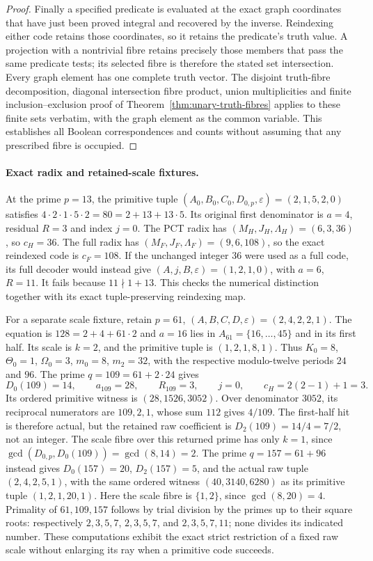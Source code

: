 \begin{proof}
Finally a specified predicate is evaluated at the exact graph
coordinates that have just been proved integral and recovered by
the inverse.  Reindexing either code retains those coordinates, so
it retains the predicate's truth value.  A projection with a
nontrivial fibre retains precisely those members that pass the same
predicate tests; its selected fibre is therefore the stated set
intersection.  Every graph element has one complete truth vector.
The disjoint truth-fibre decomposition, diagonal intersection
fibre product, union multiplicities and finite inclusion--exclusion
proof of Theorem~\ref{thm:unary-truth-fibres} applies to these
finite sets verbatim, with the graph element as the common variable.
This establishes all Boolean correspondences and counts without
assuming that any prescribed fibre is occupied.
\end{proof}

\paragraph{Exact radix and retained-scale fixtures.}
At the prime \(p=13\), the primitive tuple
\((A_0,B_0,C_0,D_{0,p},\varepsilon)=(2,1,5,2,0)\)
satisfies \(4\cdot2\cdot1\cdot5\cdot2=80=2+13+13\cdot5\).
Its original first denominator is \(a=4\), residual \(R=3\)
and index \(j=0\).  The PCT radix has
\((M_H,J_H,\Lambda_H)=(6,3,36)\), so \(c_H=36\).
The full radix has \((M_F,J_F,\Lambda_F)=(9,6,108)\),
so the exact reindexed code is \(c_F=108\).
If the unchanged integer \(36\) were used as a full code, its
full decoder would instead give \((A,j,B,\varepsilon)=(1,2,1,0)\),
with \(a=6\), \(R=11\).  It fails because \(11\nmid1+13\).
This checks the numerical distinction together with its exact
tuple-preserving reindexing map.

For a separate scale fixture, retain \(p=61\),
\((A,B,C,D,\varepsilon)=(2,4,2,2,1)\).
The equation is \(128=2+4+61\cdot2\) and \(a=16\)
lies in \(A_{61}=\{16,\ldots,45\}\) and in its first half.
Its scale is \(k=2\), and the primitive tuple is \((1,2,1,8,1)\).
Thus \(K_0=8\), \(\Theta_0=1\), \(\Omega_0=3\),
\(m_0=8\), \(m_2=32\), with the respective modulo-twelve
periods \(24\) and \(96\).
The prime \(q=109=61+2\cdot24\) gives
\[
 D_0(109)=14,\qquad a_{109}=28,\qquad R_{109}=3,
 \qquad j=0,\qquad c_H=2(2-1)+1=3.
\]
Its ordered primitive witness is \((28,1526,3052)\).
Over denominator \(3052\), its reciprocal numerators are
\(109,2,1\), whose sum \(112\) gives \(4/109\).
The first-half hit is therefore actual, but the retained raw
coefficient is \(D_2(109)=14/4=7/2\), not an integer.
The scale fibre over this returned prime has only \(k=1\),
since \(\gcd(D_{0,p},D_0(109))=\gcd(8,14)=2\).
The prime \(q=157=61+96\) instead gives
\(D_0(157)=20\), \(D_2(157)=5\), and the actual raw tuple
\((2,4,2,5,1)\), with the same ordered witness
\((40,3140,6280)\) as its primitive tuple \((1,2,1,20,1)\).
Here the scale fibre is \(\{1,2\}\), since \(\gcd(8,20)=4\).
Primality of \(61,109,157\) follows by trial division by the
primes up to their square roots: respectively
\(2,3,5,7\), \(2,3,5,7\), and \(2,3,5,7,11\);
none divides its indicated number.  These computations exhibit the
exact strict restriction of a fixed raw scale without enlarging its
ray when a primitive code succeeds.
